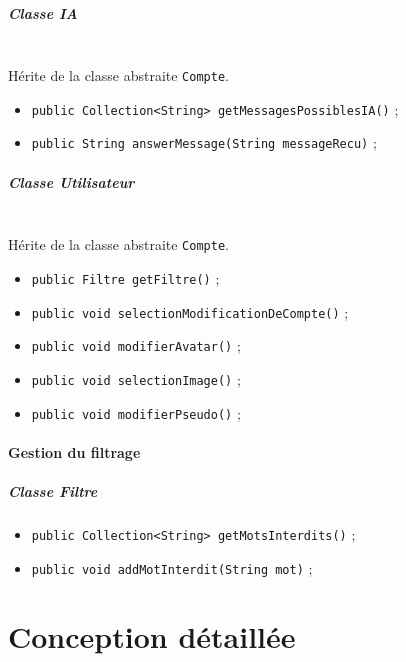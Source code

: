 \documentclass[11pt,dvipsnames,svgnames]{report}
\begin{document}
\paragraph*{Classe IA}~\\
Hérite de la classe abstraite \texttt{Compte}.
\begin{itemize}
\item \texttt{public Collection<String> getMessagesPossiblesIA()} ;
\item \texttt{public String answerMessage(String messageRecu)} ;
\end{itemize}

\paragraph*{Classe Utilisateur}~\\
Hérite de la classe abstraite \texttt{Compte}.
\begin{itemize}
\item \texttt{public Filtre getFiltre()} ;
\item \texttt{public void selectionModificationDeCompte()} ;
\item \texttt{public void modifierAvatar()} ;
\item \texttt{public void selectionImage()} ;
\item \texttt{public void modifierPseudo()} ;
\end{itemize}


\subsubsection{\og Gestion du filtrage \fg}

\paragraph*{Classe Filtre}
\begin{itemize}
\item \texttt{public Collection<String> getMotsInterdits()} ;
\item \texttt{public void addMotInterdit(String mot)} ;
\end{itemize}






\chapter{Conception détaillée}
\end{document}
